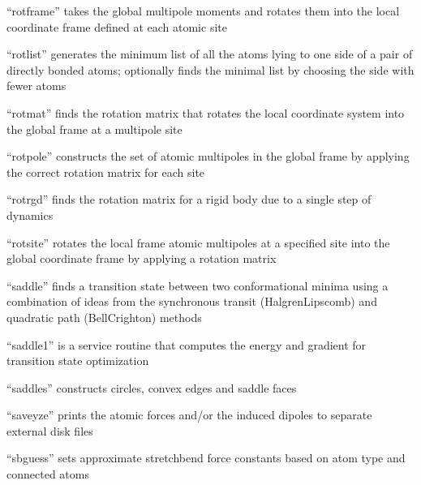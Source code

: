 \documentclass[letterpaper,11pt,english]{sphinxmanual}
\begin{document}
“rotframe” takes the global multipole moments and rotates them
into the local coordinate frame defined at each atomic site


“rotlist” generates the minimum list of all the atoms lying
to one side of a pair of directly bonded atoms; optionally
finds the minimal list by choosing the side with fewer atoms


“rotmat” finds the rotation matrix that rotates the local
coordinate system into the global frame at a multipole site


“rotpole” constructs the set of atomic multipoles in the global
frame by applying the correct rotation matrix for each site


“rotrgd” finds the rotation matrix for a rigid body due
to a single step of dynamics


“rotsite” rotates the local frame atomic multipoles at a
specified site into the global coordinate frame by applying
a rotation matrix


“saddle” finds a transition state between two conformational
minima using a combination of ideas from the synchronous transit
(Halgren\sphinxhyphen{}Lipscomb) and quadratic path (Bell\sphinxhyphen{}Crighton) methods


“saddle1” is a service routine that computes the energy and
gradient for transition state optimization


“saddles” constructs circles, convex edges and saddle faces


“saveyze” prints the atomic forces and/or the induced dipoles
to separate external disk files


“sbguess” sets approximate stretch\sphinxhyphen{}bend force constants based
on atom type and connected atoms

\end{document}

